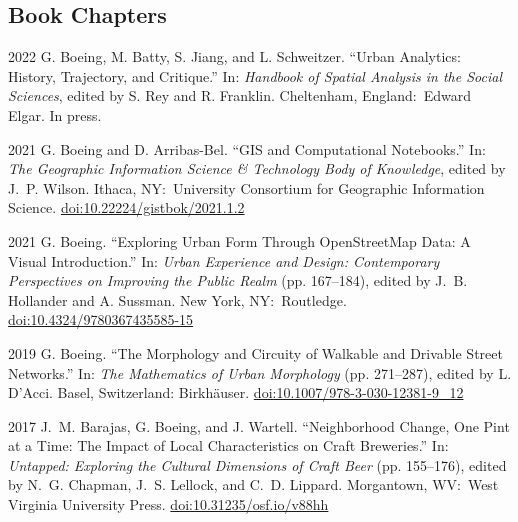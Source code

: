 \documentclass[12pt,letterpaper]{report}
\begin{document}
    \subsection*{Book Chapters}

    \begin{tablist}

        \item[2022] \tab{}G. Boeing, M. Batty, S. Jiang, and L. Schweitzer. \enquote{Urban Analytics: History, Trajectory, and Critique.} In: \textit{Handbook of Spatial Analysis in the Social Sciences}, edited by S. Rey and R. Franklin. Cheltenham, England:\ Edward Elgar. In press.

        \item[2021] \tab{}G. Boeing and D. Arribas-Bel. \enquote{GIS and Computational Notebooks.} In: \textit{The Geographic Information Science \& Technology Body of Knowledge}, edited by J.~P. Wilson. Ithaca, NY:\ University Consortium for Geographic Information Science. \href{https://doi.org/10.22224/gistbok/2021.1.2}{doi:10.22224/gistbok/2021.1.2}

        \item[2021] \tab{}G. Boeing. \enquote{Exploring Urban Form Through OpenStreetMap Data: A Visual Introduction.} In: \textit{Urban Experience and Design: Contemporary Perspectives on Improving the Public Realm} (pp. 167--184), edited by J.~B. Hollander and A. Sussman. New York, NY:\ Routledge. \href{https://doi.org/10.4324/9780367435585-15}{doi:10.4324/9780367435585-15}

        \item[2019] \tab{}G. Boeing. \enquote{The Morphology and Circuity of Walkable and Drivable Street Networks.} In: \textit{The Mathematics of Urban Morphology} (pp. 271--287), edited by L. D'Acci. Basel, Switzerland: Birkh{\"a}user. \href{https://doi.org/10.1007/978-3-030-12381-9_12}{doi:10.1007/978-3-030-12381-9\_12}

        \item[2017] \tab{}J.~M. Barajas, G. Boeing, and J. Wartell. \enquote{Neighborhood Change, One Pint at a Time: The Impact of Local Characteristics on Craft Breweries.} In: \textit{Untapped: Exploring the Cultural Dimensions of Craft Beer} (pp. 155--176), edited by N.~G. Chapman, J.~S. Lellock, and C.~D. Lippard. Morgantown, WV:\ West Virginia University Press. \href{https://doi.org/10.31235/osf.io/v88hh}{doi:10.31235/osf.io/v88hh}

    \end{tablist}
\end{document}

